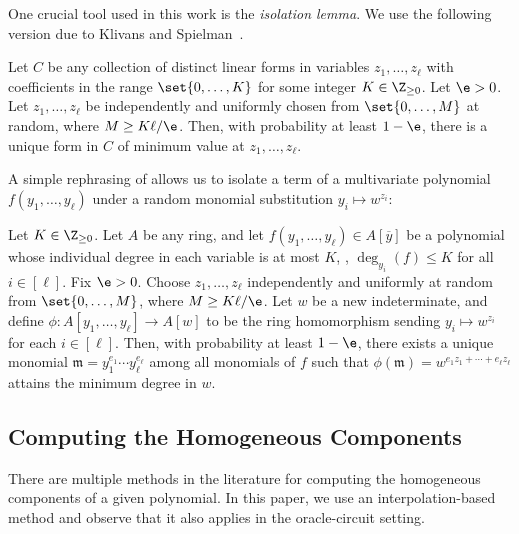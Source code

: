 \documentclass[letterpaper, 11pt]{amsart}
\begin{document}
One crucial tool used in this work is the \emph{isolation lemma}.
We use the following version due to Klivans and Spielman~\cite{KS01}.

\begin{lem}[{\cite[Lemma 4]{KS01}}]\label{lem:isolation_forms}
    Let $C$ be any collection of distinct linear forms in variables $z_1, \ldots, z_\ell$ with coefficients in the range $\set{0, \ldots, K}$ for some integer $K \in \Z_{\geq 0}$.
    Let $\e > 0$.
    Let $z_1, \ldots, z_\ell$ be independently and uniformly chosen from $\set{0, \ldots, M}$ at random, where $M\geq K \ell / \e$.
    Then, with probability at least $1 - \e$, there is a unique form in $C$ of minimum value at $z_1, \ldots, z_\ell$.
\end{lem}

A simple rephrasing of  allows us to isolate a term of a multivariate polynomial $f(y_1,\dots,y_\ell)$ under a random monomial substitution $y_i\mapsto w^{z_i}$:
\begin{cor}\label{cor:isolation_exponents}
    Let $K \in \Z_{\geq 0}$.  
    Let $A$ be any ring, and let $f(y_1, \ldots, y_\ell) \in A[\overline{y}]$ be a polynomial whose individual degree in each variable is at most $K$, \ie, $\deg_{y_i}(f) \leq K$ for all $i \in [\ell]$.  
    Fix $\e > 0$.  
    Choose $z_1, \ldots, z_\ell$ independently and uniformly at random from $\set{0, \ldots, M}$, where $M \geq K\ell/\e$.  
    Let $w$ be a new indeterminate, and define $\phi \colon A[y_1, \ldots, y_\ell] \to A[w]$ to be the ring homomorphism sending $y_i \mapsto w^{z_i}$ for each $i \in [\ell]$.  
    Then, with probability at least $1 - \e$, there exists a unique monomial $\mathfrak{m} = y_1^{e_1}\cdots y_\ell^{e_\ell}$ among all monomials of $f$ such that  $\phi(\mathfrak{m}) = w^{e_1 z_1 + \cdots + e_\ell z_\ell}$
    attains the minimum degree in $w$.
\end{cor}

\subsection{Computing the Homogeneous Components}

There are multiple methods in the literature for computing the homogeneous components of a given polynomial.
In this paper, we use an interpolation-based method and observe that it also applies in the oracle-circuit setting.
\end{document}
